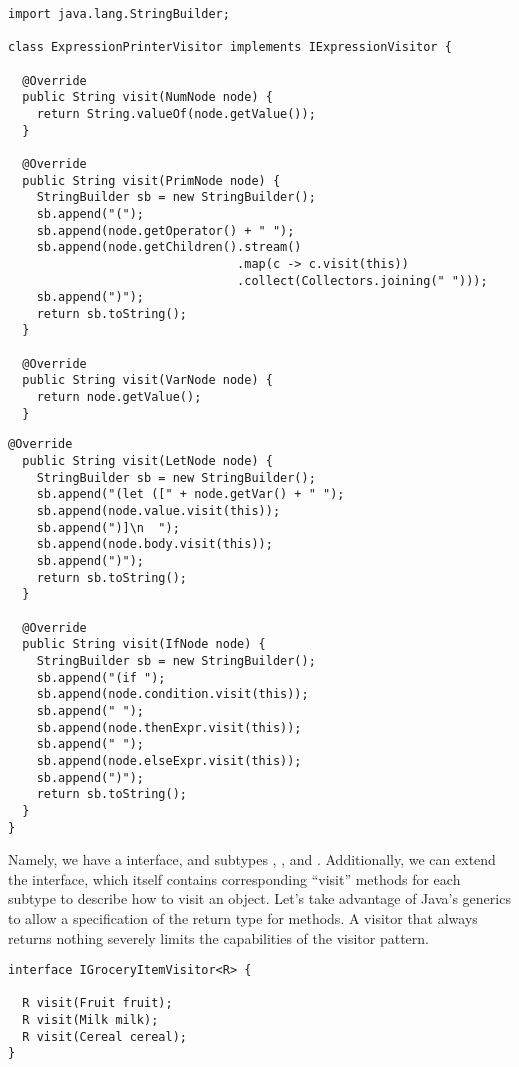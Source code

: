 \begin{lstlisting}[language=MyJava]
import java.lang.StringBuilder; 

class ExpressionPrinterVisitor implements IExpressionVisitor {

  @Override
  public String visit(NumNode node) {
    return String.valueOf(node.getValue());
  }
  
  @Override
  public String visit(PrimNode node) {
    StringBuilder sb = new StringBuilder();
    sb.append("(");
    sb.append(node.getOperator() + " ");
    sb.append(node.getChildren().stream()
                                .map(c -> c.visit(this))
                                .collect(Collectors.joining(" ")));
    sb.append(")");
    return sb.toString();
  }
  
  @Override
  public String visit(VarNode node) {
    return node.getValue();
  }
\end{lstlisting}
\newpage
\begin{lstlisting}[language=MyJava]
  @Override
  public String visit(LetNode node) {
    StringBuilder sb = new StringBuilder();
    sb.append("(let ([" + node.getVar() + " ");
    sb.append(node.value.visit(this));
    sb.append(")]\n  ");
    sb.append(node.body.visit(this));
    sb.append(")");
    return sb.toString();
  }
  
  @Override
  public String visit(IfNode node) {
    StringBuilder sb = new StringBuilder();
    sb.append("(if ");
    sb.append(node.condition.visit(this));
    sb.append(" ");
    sb.append(node.thenExpr.visit(this));
    sb.append(" ");
    sb.append(node.elseExpr.visit(this));
    sb.append(")");
    return sb.toString();
  }
}
\end{lstlisting}

Namely, we have a  interface, and subtypes , , and . 
Additionally, we can extend the  interface, which itself contains corresponding ``visit'' methods for each subtype to describe how to visit an  object. 
Let's take advantage of Java's generics to allow a specification of the return type for  methods. 
A visitor that always returns nothing severely limits the capabilities of the visitor pattern.

\begin{lstlisting}[language=MyJava]
interface IGroceryItemVisitor<R> {

  R visit(Fruit fruit);
  R visit(Milk milk);
  R visit(Cereal cereal);
}
\end{lstlisting}

